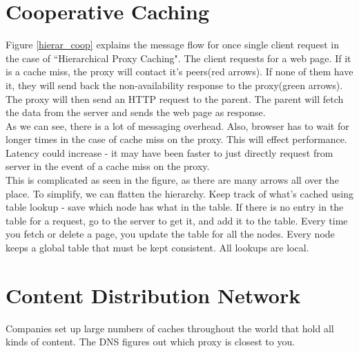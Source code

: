 \documentclass[twoside]{article}
\begin{document}
\section{Cooperative Caching}
Figure \ref{hierar_coop} explains the message flow for once single client request in the case of ``Hierarchical Proxy Caching". The client requests for a web page. If it is a cache miss, the proxy will contact it's peers(red arrows). If none of them have it, they will send back the non-availability response to the proxy(green arrows). The proxy will then send an HTTP request to the parent. The parent will fetch the data from the server and sends the web page as response.\\
As we can see, there is a lot of messaging overhead. Also, browser has to wait for longer times in the case of cache miss on the proxy. This will effect performance. Latency could increase - it may have been faster to just directly request from server in the event of a cache miss on the proxy. \\

This is complicated as seen in the figure, as there are many arrows all over the place. To simplify, we can flatten the hierarchy. Keep track of what's cached using table lookup - save which node has what in the table. If there is no entry in the table for a request, go to the server to get it, and add it to the table. Every time you fetch or delete a page, you update the table for all the nodes. Every node keeps a global table that must be kept consistent. All lookups are local. \\

\section{Content Distribution Network}
Companies set up large numbers of caches throughout the world that hold all kinds of content. The DNS figures out which proxy is closest to you.
\end{document}
